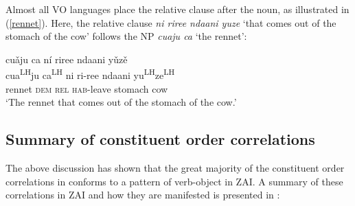 Almost all VO languages place the relative clause after the noun, as illustrated in (\ref{rennet}). Here, the relative clause \textit{ni riree ndaani yuze} `that comes out of the stomach of the cow' follows the NP \textit{cuaju ca} `the rennet':

\ea\label{rennet}
\glll cu\v{a}ju ca n\'{i} riree ndaani y\v{u}z\v{e} \\
cua\textsuperscript{LH}ju ca\textsuperscript{LH} ni ri-ree ndaani yu\textsuperscript{LH}ze\textsuperscript{LH} \\
rennet \textsc{dem} \textsc{rel} \textsc{hab}-leave stomach cow \\
\glt `The rennet that comes out of the stomach of the cow.'
\z



\subsection{Summary of constituent order correlations}

The above discussion has shown that the great majority of the constituent order correlations in  conforms to a pattern of verb-object in ZAI. A summary of these correlations in ZAI and how they are manifested is presented in :

